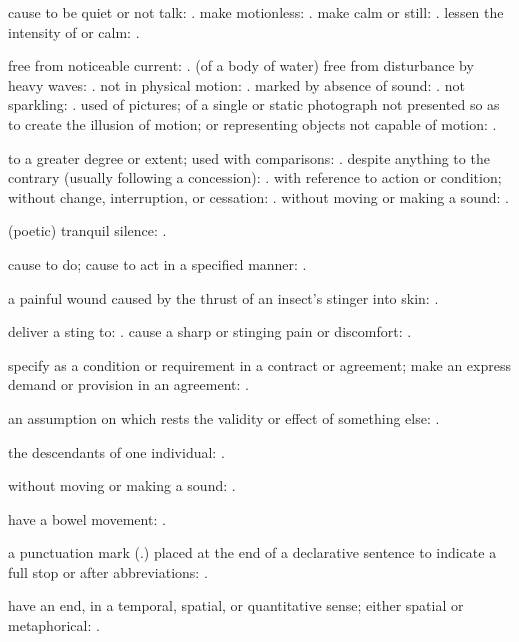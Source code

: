   cause to be quiet or not talk: . make motionless: . make calm or still: . lessen the intensity of or calm: .

  free from noticeable current: . (of a body of water) free from disturbance by heavy waves: . not in physical motion: . marked by absence of sound: . not sparkling: . used of pictures; of a single or static photograph not presented so as to create the illusion of motion; or representing objects not capable of motion: .

  to a greater degree or extent; used with comparisons: . despite anything to the contrary (usually following a concession): . with reference to action or condition; without change, interruption, or cessation: . without moving or making a sound: .

  (poetic) tranquil silence: .

  cause to do; cause to act in a specified manner: .

  a painful wound caused by the thrust of an insect's stinger into skin: .

  deliver a sting to: . cause a sharp or stinging pain or discomfort: .

  specify as a condition or requirement in a contract or agreement; make an express demand or provision in an agreement: .

  an assumption on which rests the validity or effect of something else: .

  the descendants of one individual: .

  without moving or making a sound: .

  have a bowel movement: .

  a punctuation mark (.) placed at the end of a declarative sentence to indicate a full stop or after abbreviations: .

  have an end, in a temporal, spatial, or quantitative sense; either spatial or metaphorical: .

